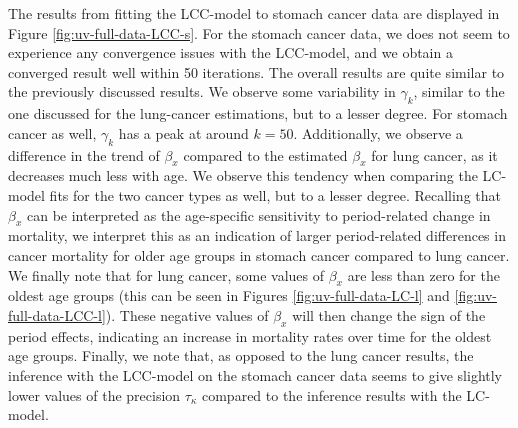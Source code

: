 \newpar The results from fitting the LCC-model to stomach cancer data are displayed in Figure \ref{fig:uv-full-data-LCC-s}. For the stomach cancer data, we \inlabru does not seem to experience any convergence issues with the LCC-model, and we obtain a converged result well within 50 iterations. The overall results are quite similar to the previously discussed results. We observe some variability in $\gamma_k$, similar to the one discussed for the lung-cancer estimations, but to a lesser degree. For stomach cancer as well, $\gamma_k$ has a peak at around $k = 50$. Additionally, we observe a difference in the trend of $\beta_x$ compared to the estimated $\beta_x$ for lung cancer, as it decreases much less with age. We observe this tendency when comparing the LC-model fits for the two cancer types as well, but to a lesser degree. Recalling that $\beta_x$ can be interpreted as the age-specific sensitivity to period-related change in mortality, we interpret this as an indication of larger period-related differences in cancer mortality for older age groups in stomach cancer compared to lung cancer. We finally note that for lung cancer, some values of $\beta_x$ are less than zero for the oldest age groups (this can be seen in Figures \ref{fig:uv-full-data-LC-l} and \ref{fig:uv-full-data-LCC-l}). These negative values of $\beta_x$ will then change the sign of the period effects, indicating an increase in mortality rates over time for the oldest age groups. Finally, we note that, as opposed to the lung cancer results, the inference with the LCC-model on the stomach cancer data seems to give slightly lower values of the precision $\tau_\kappa$ compared to the inference results with the LC-model. 




